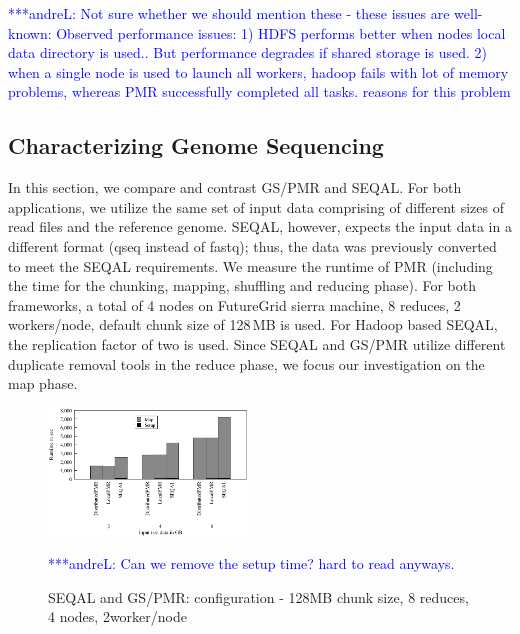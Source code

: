 \documentclass{acm_proc_article-sp}
\newcommand{\alnote}[1]{ {\textcolor{blue} { ***andreL: #1 }}}
\newcommand{\alnote}[1]{}
\begin{document}
\alnote{Not sure whether we should mention these - these issues are well-known: Observed performance issues:
1) HDFS performs better when nodes local data directory is used.. But performance degrades if shared storage is used. 			
2) when a single node is used to launch all workers, hadoop fails with lot of memory problems, whereas PMR successfully completed all tasks.			
reasons for this problem}


\subsection{Characterizing Genome Sequencing}

In this section, we compare and contrast GS/PMR and SEQAL. For both
applications, we utilize the same set of input data comprising of different
sizes of read files and the reference genome. SEQAL, however, expects the 
input data in a different format (qseq instead of fastq); thus, the data was 
previously converted to meet the SEQAL requirements. We measure the
runtime of PMR (including the time for the chunking, mapping, shuffling
and reducing phase). For both frameworks, a total of 4 nodes on FutureGrid 
sierra machine, 8 reduces, 2 workers/node, default chunk size of 128\,MB is 
used. For Hadoop based SEQAL, the replication factor of two is used. Since SEQAL 
and GS/PMR utilize different duplicate removal tools in the reduce phase, we 
focus our investigation on the map phase. 


\begin{figure}[ht]
	\centering
		\includegraphics[width=0.47\textwidth]{figures/seqalvspmr_map.pdf}
\caption{SEQAL and GS/PMR: configuration - 128MB chunk size, 8 reduces, 4 nodes, 2worker/node} 	
\alnote{Can we remove the setup time? hard to read anyways. }
\label{fig:seqalvspmr_map}
\end{figure}		
\end{document}
